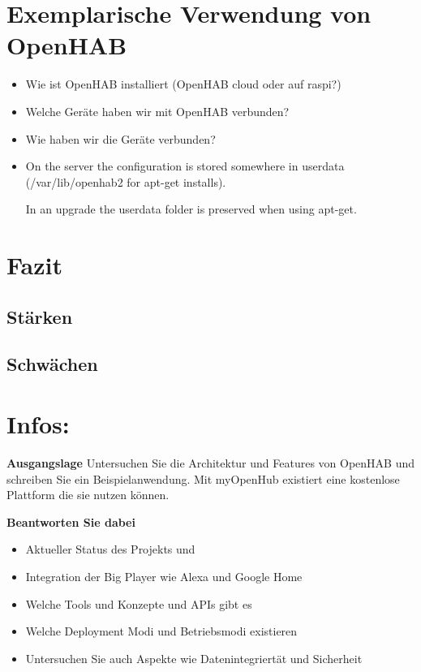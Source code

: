 \section{Exemplarische Verwendung von OpenHAB}
\begin{itemize}
	\item Wie ist OpenHAB installiert (OpenHAB cloud oder auf raspi?)
	\item Welche Geräte haben wir mit OpenHAB verbunden?
	\item Wie haben wir die Geräte verbunden?
	\item On the server the configuration is stored somewhere in userdata (/var/lib/openhab2 for apt-get installs).
	
	In an upgrade the userdata folder is preserved when using apt-get.
\end{itemize}



\section{Fazit}
\subsection{Stärken}
\subsection{Schwächen}

\section{Infos:}
\textbf{Ausgangslage}
Untersuchen Sie die Architektur und Features von OpenHAB und
schreiben Sie ein Beispielanwendung.
Mit myOpenHub existiert eine kostenlose Plattform die sie nutzen
können.

\textbf{Beantworten Sie dabei}
\begin{itemize}
 \item Aktueller Status des Projekts und  \item Integration der Big Player wie Alexa und Google Home
 \item Welche Tools und Konzepte und APIs gibt es
 \item Welche Deployment Modi und Betriebsmodi existieren
 \item Untersuchen Sie auch Aspekte wie Datenintegriertät und Sicherheit
\end{itemize}


